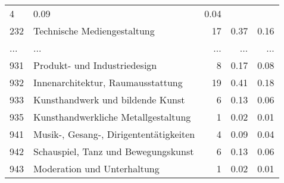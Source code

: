 \begin{longtable}{lXrrr}
          \num{4} &
          \num[round-mode=places,round-precision=2]{0,09} &
          \num[round-mode=places,round-precision=2]{0,04} \\
        232 & \multicolumn{1}{X}{Technische Mediengestaltung} & %
          \num{17} &
          \num[round-mode=places,round-precision=2]{0,37} &
          \num[round-mode=places,round-precision=2]{0,16} \\
       ... & ... & ... & ... & ... \\
        931 & \multicolumn{1}{X}{Produkt- und Industriedesign} & %
          \num{8} &
          \num[round-mode=places,round-precision=2]{0,17} &
          \num[round-mode=places,round-precision=2]{0,08} \\

        932 & \multicolumn{1}{X}{Innenarchitektur, Raumausstattung} & %
          \num{19} &
          \num[round-mode=places,round-precision=2]{0,41} &
          \num[round-mode=places,round-precision=2]{0,18} \\

        933 & \multicolumn{1}{X}{Kunsthandwerk und bildende Kunst} & %
          \num{6} &
          \num[round-mode=places,round-precision=2]{0,13} &
          \num[round-mode=places,round-precision=2]{0,06} \\

        935 & \multicolumn{1}{X}{Kunsthandwerkliche Metallgestaltung} & %
          \num{1} &
          \num[round-mode=places,round-precision=2]{0,02} &
          \num[round-mode=places,round-precision=2]{0,01} \\

        941 & \multicolumn{1}{X}{Musik-, Gesang-, Dirigententätigkeiten} & %
          \num{4} &
          \num[round-mode=places,round-precision=2]{0,09} &
          \num[round-mode=places,round-precision=2]{0,04} \\

        942 & \multicolumn{1}{X}{Schauspiel, Tanz und Bewegungskunst} & %
          \num{6} &
          \num[round-mode=places,round-precision=2]{0,13} &
          \num[round-mode=places,round-precision=2]{0,06} \\

        943 & \multicolumn{1}{X}{Moderation und Unterhaltung} & %
          \num{1} &
          \num[round-mode=places,round-precision=2]{0,02} &
          \num[round-mode=places,round-precision=2]{0,01} \\


\end{longtable}
